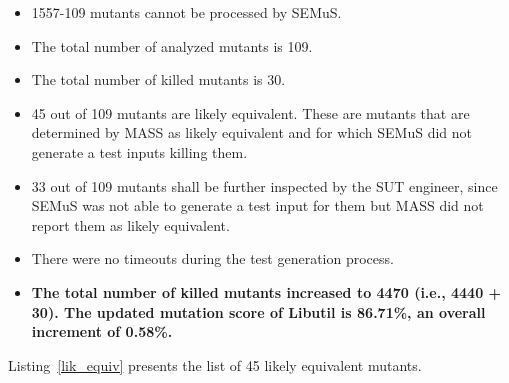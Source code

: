 \begin{itemize}
	\item 1557-109 mutants cannot be processed by SEMuS.
	\item The total number of analyzed mutants is 109.
	\item The total number of killed mutants is 30.
	\item 45 out of 109 mutants are likely equivalent. These are mutants that are determined by MASS as likely equivalent and for which SEMuS did not generate a test inputs killing them.
	\item 33 out of 109 mutants shall be further inspected by the SUT engineer, since SEMuS was not able to generate a test input for them but MASS did not report them as likely equivalent.
	\item There were no timeouts during the test generation process.
	\item \textbf{The total number of killed mutants increased to 4470 (i.e., 4440 + 30). The updated mutation score of Libutil is 86.71\%, an overall increment of 0.58\%.}
\end{itemize}


Listing~\ref{lik_equiv} presents the list of 45 likely equivalent mutants.

